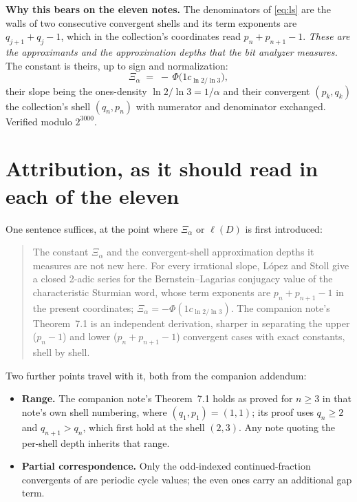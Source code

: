 \documentclass[10pt]{article}
\newcommand{\Xa}{\Xi_{\alpha}}
\begin{document}
\medskip
\noindent\textbf{Why this bears on the eleven notes.} The denominators of \eqref{eq:ls} are the
walls of two consecutive convergent shells and its term exponents are $q_{j+1}+q_j-1$, which in
the collection's coordinates read $p_n+p_{n+1}-1$. \emph{These are the approximants and the
approximation depths that the bit analyzer measures.} The constant is theirs, up to sign and
normalization:
\[
\Xa \;=\; -\,\Phi\bigl(1c_{\ln 2/\ln 3}\bigr),
\]
their slope being the ones-density $\ln 2/\ln 3 = 1/\alpha$ and their convergent $(p_k,q_k)$ the
collection's shell $(q_n,p_n)$ with numerator and denominator exchanged. Verified modulo
$2^{3000}$.

\section{Attribution, as it should read in each of the eleven}

One sentence suffices, at the point where $\Xa$ or $\ell(D)$ is first introduced:

\begin{quote}
The constant $\Xa$ and the convergent-shell approximation depths it measures are not new here.
For every irrational slope, L\'opez and Stoll \cite{lopez2009conjugacy} give a closed 2-adic
series for the Bernstein--Lagarias conjugacy value of the characteristic Sturmian word, whose term
exponents are $p_n+p_{n+1}-1$ in the present coordinates; $\Xa=-\Phi(1c_{\ln 2/\ln 3})$. The
companion note's Theorem~7.1 is an independent derivation, sharper in separating the upper
($p_n-1$) and lower ($p_n+p_{n+1}-1$) convergent cases with exact constants, shell by shell.
\end{quote}

\noindent Two further points travel with it, both from the companion addendum:

\begin{itemize}\itemsep1pt
\item \textbf{Range.} The companion note's Theorem~7.1 holds as proved for $n\ge 3$ in that note's
own shell numbering, where $(q_1,p_1)=(1,1)$; its proof uses $q_n\ge 2$ and $q_{n+1}>q_n$, which
first hold at the shell $(2,3)$. Any note quoting the per-shell depth inherits that range.
\item \textbf{Partial correspondence.} Only the odd-indexed continued-fraction convergents of
\cite{lopez2009conjugacy} are periodic cycle values; the even ones carry an additional gap term.
\end{itemize}
\end{document}

